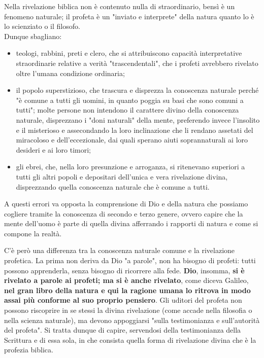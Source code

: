 Nella rivelazione biblica non è contenuto nulla di straordinario, bensì è un fenomeno naturale; il profeta è un "inviato e interprete" della natura quanto lo è lo scienziato o il filosofo.\\
Dunque sbagliano: 
\begin{itemize}
	\item teologi,
	rabbini, preti e clero, che si attribuiscono capacità interpretative straordinarie relative a verità "trascendentali", che i profeti avrebbero rivelato oltre l'umana condizione ordinaria;
	\item il popolo superstizioso, che trascura e disprezza la conoscenza naturale perché "è comune a tutti gli uomini, in
	quanto poggia su basi che sono comuni a tutti"; molte persone non intendono il carattere divino della
	conoscenza naturale, disprezzano i "doni naturali"
	della mente, preferendo invece l'insolito e il misterioso e assecondando la loro inclinazione 
	che li rendano assetati del miracoloso e dell'eccezionale, dai quali sperano aiuti soprannaturali ai loro
	desideri e ai loro timori;
	\item gli ebrei, che, nella loro presunzione e
	arroganza, si ritenevano superiori a tutti gli altri popoli e depositari dell'unica e vera rivelazione
	divina, disprezzando quella conoscenza naturale che è comune a tutti.
\end{itemize}

A questi errori va opposta la comprensione di Dio e della natura che possiamo cogliere tramite la conoscenza di secondo e terzo genere, ovvero capire che la mente dell'uomo è parte di quella divina afferrando i rapporti di natura e come si compone la realtà.

C'è però una differenza tra la conoscenza naturale comune e la rivelazione profetica. La prima non
deriva da Dio "a parole", non ha bisogno di profeti: tutti
possono apprenderla, senza bisogno di ricorrere alla fede. \textbf{Dio}, insomma, \textbf{si è rivelato a parole ai profeti; ma si è anche rivelato}, come diceva
Galileo, \textbf{nel gran libro della natura e qui la ragione umana lo ritrova in modo assai più conforme
al suo proprio pensiero}. Gli
uditori del profeta non possono riscoprire in se stessi la divina rivelazione (come accade nella
filosofia o nella scienza naturale), ma devono appoggiarsi "sulla testimonianza e sull'autorità del
profeta". Si tratta dunque di capire, servendosi della testimonianza della Scrittura e di essa sola, in
che consista quella forma di rivelazione divina che è la profezia biblica.

